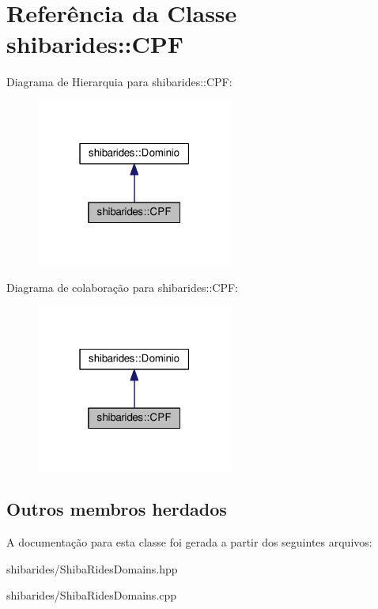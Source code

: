 \hypertarget{classshibarides_1_1CPF}{}\section{Referência da Classe shibarides\+:\+:C\+PF}
\label{classshibarides_1_1CPF}


Diagrama de Hierarquia para shibarides\+:\+:C\+PF\+:\nopagebreak
\begin{figure}[H]
\begin{center}
\leavevmode
\includegraphics[width=183pt]{classshibarides_1_1CPF__inherit__graph}
\end{center}
\end{figure}


Diagrama de colaboração para shibarides\+:\+:C\+PF\+:\nopagebreak
\begin{figure}[H]
\begin{center}
\leavevmode
\includegraphics[width=183pt]{classshibarides_1_1CPF__coll__graph}
\end{center}
\end{figure}
\subsection*{Outros membros herdados}


A documentação para esta classe foi gerada a partir dos seguintes arquivos\+:\begin{DoxyCompactItemize}
\item 
shibarides/Shiba\+Rides\+Domains.\+hpp\item 
shibarides/Shiba\+Rides\+Domains.\+cpp\end{DoxyCompactItemize}
